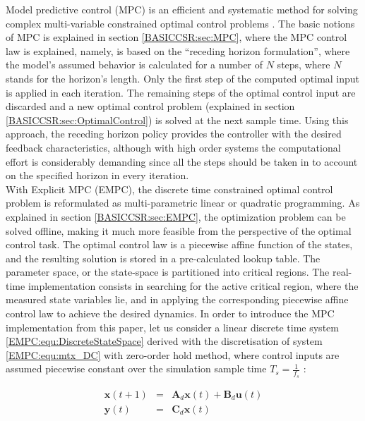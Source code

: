     Model predictive control (MPC) is an efficient and systematic method for solving complex multi-variable constrained optimal control problems \cite{vajda2017limiting}. The basic notions of MPC is explained in section \ref{BASICCSR:sec:MPC}, where the MPC control law is explained, namely, is based on the “receding horizon formulation”, where the model’s assumed behavior is calculated for a number of $N$ steps, where $N$ stands for the horizon’s length. Only the first step of the computed optimal input is applied in each iteration. The remaining steps of the optimal control input are discarded and a new optimal control problem (explained in section \ref{BASICCSR:sec:OptimalControl}) is solved at the next sample time. Using this approach, the receding horizon policy provides the controller with the desired feedback characteristics, although with high order systems the computational effort is considerably demanding since all the steps should be taken in to account on the specified horizon in every iteration.\\
		With Explicit MPC (EMPC), the discrete time constrained optimal control problem is reformulated as multi-parametric linear or quadratic programming. As explained in section \ref{BASICCSR:sec:EMPC}, the optimization problem can be solved offline, making it much more feasible from the perspective of the optimal control task. The optimal control law is a piecewise affine function of the states, and the resulting solution is stored in a pre-calculated lookup table. The parameter space, or the state-space is partitioned into critical regions. The real-time implementation consists in searching for the active critical region, where the measured state variables lie, and in applying the corresponding piecewise affine control law to achieve the desired dynamics.
    In order to introduce the MPC implementation from this paper, let us consider a linear discrete time system \ref{EMPC:equ:DiscreteStateSpace} derived with the discretisation of system \ref{EMPC:equ:mtx_DC} with zero-order hold method, where control inputs are assumed piecewise constant over the simulation sample time $T_s=\frac{1}{f_s}$ :

    \begin{equation}
        \begin{array}{rcl}
            \textbf{x}(t+1)&=&\textbf{A}_d\textbf{x}(t)+\textbf{B}_d\textbf{u}(t)\\
            \textbf{y}(t)&=&\textbf{C}_d\textbf{x}(t)
        \end{array}
        \label{EMPC:equ:DiscreteStateSpace}
    \end{equation}

